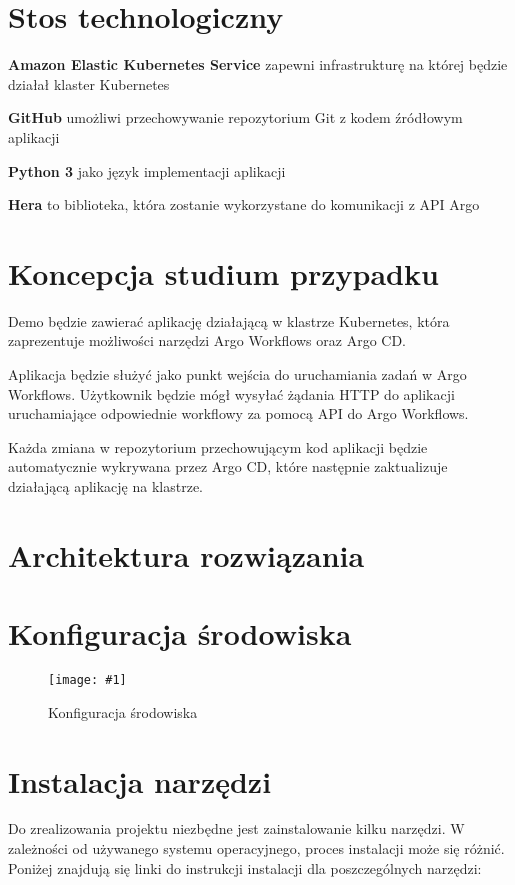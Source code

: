 \documentclass{article}
\newcommand{\img}[4]{
    \begin{figure}[!htbp]
    \centering
    \texttt{[image: \#1]}
    \caption{#2}
    \label{#3}
    \end{figure}
}
\begin{document}
\section{Stos technologiczny}
\begin{description}
\item{\textbf{Amazon Elastic Kubernetes Service}\cite{aws-eks}} zapewni infrastrukturę na której będzie działał klaster Kubernetes

\item{\textbf{GitHub}\cite{github}} umożliwi przechowywanie repozytorium Git z kodem źródłowym aplikacji

\item{\textbf{Python 3}\cite{python}} jako język implementacji aplikacji

\item{\textbf{Hera}\cite{hera}} to biblioteka, która zostanie wykorzystane do komunikacji z API Argo
\end{description}


\section{Koncepcja studium przypadku}
Demo będzie zawierać aplikację działającą w klastrze Kubernetes, która zaprezentuje możliwości narzędzi Argo Workflows oraz Argo CD.

Aplikacja będzie służyć jako punkt wejścia do uruchamiania zadań w Argo Workflows. Użytkownik będzie mógł wysyłać
żądania HTTP do aplikacji uruchamiające odpowiednie workflowy za pomocą API do Argo Workflows.

Każda zmiana w repozytorium przechowującym kod aplikacji będzie automatycznie wykrywana przez Argo CD, które następnie zaktualizuje działającą aplikację na klastrze.


\section{Architektura rozwiązania}

\section{Konfiguracja środowiska}

\img{img/suu_env_conf.drawio.png}{Konfiguracja środowiska}{fig:env-conf}{1}


\section{Instalacja narzędzi}
Do zrealizowania projektu niezbędne jest zainstalowanie kilku narzędzi. W zależności od używanego systemu operacyjnego, proces instalacji może się różnić. Poniżej znajdują się linki do instrukcji instalacji dla poszczególnych narzędzi:
\end{document}
